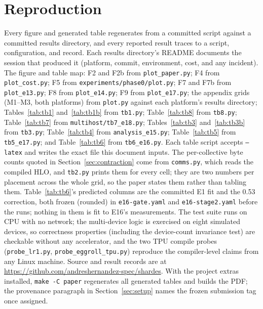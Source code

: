\section{Reproduction}
Every figure and generated table regenerates from a committed script against
a committed results directory, and every reported result traces to a script,
configuration, and record. Each results directory's README documents the
session that produced it (platform, commit, environment, cost, and any
incident). The figure and table map: F2 and F2b from
\texttt{plot\_paper.py}; F4 from \texttt{plot\_cost.py}; F5 from
\texttt{experiments/phase0/plot.py}; F7 and F7b from \texttt{plot\_e13.py}; F8 from
\texttt{plot\_e14.py}; F9 from \texttt{plot\_e17.py}; the appendix grids
(M1--M3, both platforms) from
\texttt{plot.py} against each platform's results directory;
Tables~\ref{tab:tb1} and~\ref{tab:tb1b} from \texttt{tb1.py};
Table~\ref{tab:tb8} from \texttt{tb8.py}; Table~\ref{tab:tb7} from
\texttt{multihost/tb7\_e18.py}; Tables~\ref{tab:tb3}
and~\ref{tab:tb3b} from \texttt{tb3.py};
Table~\ref{tab:tb4} from
\texttt{analysis\_e15.py}; Table~\ref{tab:tb5} from
\texttt{tb5\_e17.py}; and Table~\ref{tab:tb6} from
\texttt{tb6\_e16.py}. Each table
script accepts \texttt{--latex} and writes the exact file this document
inputs. The per-collective byte counts quoted in
Section~\ref{sec:contraction} come from \texttt{comms.py}, which reads the
compiled HLO, and \texttt{tb2.py} prints them for every cell; they are two
numbers per placement across the whole grid, so the paper states them rather
than tabling them. Table~\ref{tab:tb6}'s predicted columns are the committed E1 fit
and the 0.53 correction, both frozen (rounded) in \texttt{e16-gate.yaml}
and \texttt{e16-stage2.yaml} before the runs; nothing in them is fit to
E16's measurements. The test
suite runs on CPU with no network; the multi-device logic is exercised on
eight simulated devices, so correctness properties (including the
device-count invariance test) are checkable without any accelerator, and the
two TPU compile probes
(\texttt{probe\_lr1.py}, \texttt{probe\_eggroll\_tpu.py}) reproduce
the compiler-level claims from any Linux machine. Source and result records
are at \url{https://github.com/andreshernandez-spec/shardes}. With the project
extras installed, \texttt{make -C paper} regenerates all generated tables and
builds the PDF; the provenance paragraph in Section~\ref{sec:setup} names the
frozen submission tag once assigned.
